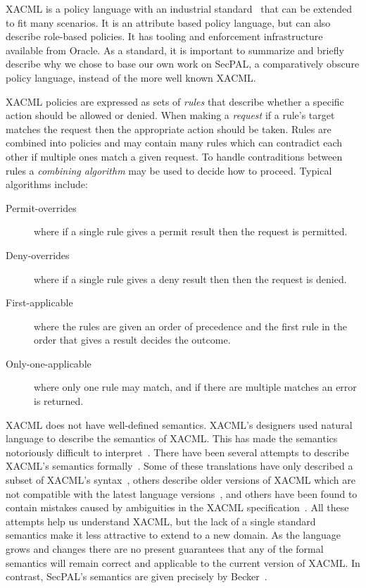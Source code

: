 \documentclass[thesis.tex]{subfiles}
\begin{document}
XACML is a policy language with an industrial
standard~\cite{oasis_extensible_2013} that can be extended to fit many
scenarios. It is an attribute based policy language, but can also describe
role-based policies. It has tooling and enforcement infrastructure available
from Oracle. As a standard, it is important to summarize and briefly describe
why we chose to base our own work on SecPAL, a comparatively obscure policy
language, instead of the more well known XACML.

XACML policies are expressed as sets of \emph{rules} that describe
whether a specific action should be allowed or denied. When making a
\emph{request} if a rule's target matches the request then the
appropriate action should be taken. Rules are combined into policies
and may contain many rules which can contradict each other if multiple
ones match a given request. To handle contraditions between rules a
\emph{combining algorithm} may be used to decide how to
proceed. Typical algorithms include:

\begin{description}
  \item[Permit-overrides] where if a single rule gives a permit result then the request is permitted.
  \item[Deny-overrides] where if a single rule gives a deny result then then the request is denied.
  \item[First-applicable] where the rules are given an order of precedence and the first rule in the order that gives a result decides the outcome.
  \item[Only-one-applicable] where only one rule may match, and if there are multiple matches an error is returned.
\end{description}

XACML does not have well-defined semantics. XACML's designers used natural
language to describe the semantics of XACML. This has made the semantics
notoriously difficult to interpret~\cite{ramli_detecting_2015}. There have been
several attempts to describe XACML's semantics
formally~\cite{ramli_xacml_2012,ramli_logic_2014,bryans_reasoning_2005}. Some of
these translations have only described a subset of XACML's
syntax~\cite{halpern_using_2008}, others describe older versions of XACML which
are not compatible with the latest language versions~\cite{ahn_reasoning_2010},
and others have been found to contain mistakes caused by ambiguities in the
XACML specification~\cite{bruns_access-control_2008,halpern_using_2008}. All
these attempts help us understand XACML, but the lack of a single standard
semantics make it less attractive to extend to a new domain. As the language
grows and changes there are no present guarantees that any of the formal
semantics will remain correct and applicable to the current version of XACML. In
contrast, SecPAL's semantics are given precisely by
Becker~\cite{becker_secpal:_2006}.
\end{document}
